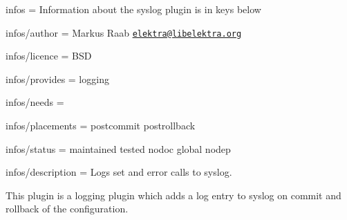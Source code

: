 
\begin{DoxyItemize}
\item infos = Information about the syslog plugin is in keys below
\item infos/author = Markus Raab \href{mailto:elektra@libelektra.org}{\tt elektra@libelektra.\+org}
\item infos/licence = B\+S\+D
\item infos/provides = logging
\item infos/needs =
\item infos/placements = postcommit postrollback
\item infos/status = maintained tested nodoc global nodep
\item infos/description = Logs set and error calls to syslog.
\end{DoxyItemize}

This plugin is a logging plugin which adds a log entry to syslog on commit and rollback of the configuration. 